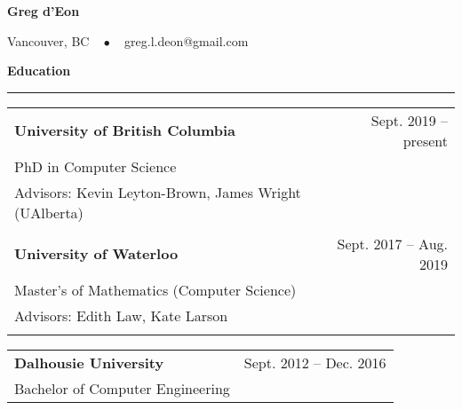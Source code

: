\documentclass{article}
\newcommand{\heading}[1]
{
	\vspace{3pt}
	\textbf{#1} 
	\vspace{-6pt}
	
	\rule{\linewidth}{0.4pt}
}
\begin{document}
\begin{center}
{\Large\textbf{Greg d'Eon}}

\vspace{0.2cm}
Vancouver, BC ~ $\bullet$ ~ 
greg.l.deon@gmail.com

\end{center}


\heading{Education}
\begin{center}
\begin{tabularx}{\textwidth}{Xr}
    \textbf{University of British Columbia} & Sept. 2019 -- present \\
    PhD in Computer Science \\
    Advisors: Kevin Leyton-Brown, James Wright (UAlberta) \\
    \\

	\textbf{University of Waterloo}	& Sept. 2017 -- Aug. 2019 \\
	Master's of Mathematics (Computer Science) \\
	Advisors: Edith Law, Kate Larson \\
	\\
\end{tabularx}
\begin{tabularx}{\textwidth}{Xr}
	\textbf{Dalhousie University}	& Sept. 2012 -- Dec. 2016 \\
	Bachelor of Computer Engineering \\
\end{tabularx}
\end{center}
\end{document}
